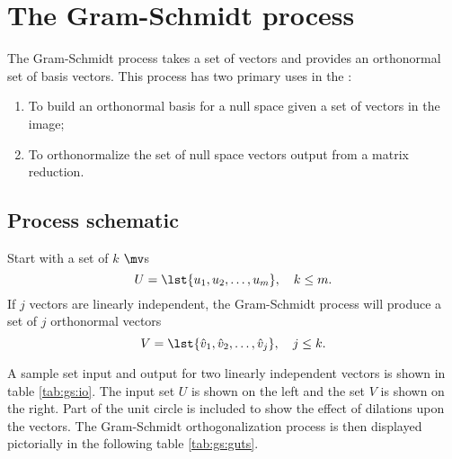 \chapter{The Gram-Schmidt process}
\label{sec:gs}

The Gram-Schmidt process takes a set of vectors and provides an orthonormal set of basis vectors. This process has two primary uses in the \svdp:
\begin{enumerate}
\item To build an orthonormal basis for a null space given a set of vectors in the image;
\item To orthonormalize the set of null space vectors output from a matrix reduction.
\end{enumerate}

\section{Process schematic}
Start with a set of $k$ $\mv$s
\begin{equation}
  U = \lst{u_{1},u_{2},\dots,u_{m}}, \quad k\le m.
\end{equation}
If $j$ vectors are linearly independent, the Gram-Schmidt process will produce a set of $j$ orthonormal vectors
\begin{equation}
  V = \lst{\hat{v}_{1},\hat{v}_{2},\dots,\hat{v}_{j}}, \quad j\le k.
\end{equation}

A sample set input and output for two linearly independent vectors is shown in table \eqref{tab:gs:io}. The input set $U$ is shown on the left and the set $V$ is shown on the right. Part of the unit circle is included to show the effect of dilations upon the vectors. The Gram-Schmidt orthogonalization process is then displayed pictorially in the following table \eqref{tab:gs:guts}.

